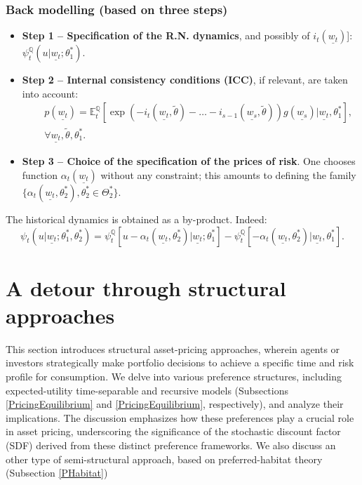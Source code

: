 \documentclass[
  12pt,
]{book}
\providecommand{\tightlist}{%
  \setlength{\itemsep}{0pt}\setlength{\parskip}{0pt}}
\theoremstyle{definition}
\theoremstyle{definition}
\theoremstyle{definition}
\theoremstyle{definition}
\theoremstyle{remark}
\begin{document}
\hypertarget{back-modelling-based-on-three-steps}{%
\subsection{Back modelling (based on three steps)}\label{back-modelling-based-on-three-steps}}

\begin{itemize}
\tightlist
\item
  \textbf{Step 1 -- Specification of the R.N. dynamics}, and possibly of \(i_{t}(\underline{w_t})\){]}: \(\psi^{\mathbb{Q}}_t (u | \underline{w_t}; \theta^*_1)\).
\item
  \textbf{Step 2 -- Internal consistency conditions (ICC)}, if relevant, are taken into account:
  \begin{equation*}
  \begin{array}{lll}
  && p(\underline{w_t}) = \mathbb{E}^{\mathbb{Q}}_t \left[ \exp (-i_{t} (\underline{w_t},\tilde{\theta}) - \dots - i_{s-1} (\underline{w_s}, \tilde{\theta}))g(\underline{w_s}) | \underline{w_t} , \theta^*_1\right] ,\\
  && \forall    \underline{w_t} , \tilde{\theta} , \theta^*_1.
  \end{array}
  \end{equation*}
\item
  \textbf{Step 3 -- Choice of the specification of the prices of risk}. One chooses function \(\alpha_t(\underline{w_t})\) without any constraint; this amounts to defining the family \(\{ \alpha_t (\underline{w_t}, \theta^*_2), \theta^*_2\in \Theta^*_2 \}\).
\end{itemize}

The historical dynamics is obtained as a by-product. Indeed:
\begin{equation*}
\psi_t(u | \underline{w_t} ; \theta^*_1, \theta^*_2) = \psi_t^{\mathbb{Q}}\left[ u -\alpha_t (\underline{w_t}, \theta^*_2)|\underline{w_t} ; \theta^*_1 \right] -\psi^{\mathbb{Q}}_t \left[- \alpha_t (\underline{w_t}, \theta^*_2) | \underline{w_t},\theta^*_1 \right].
\end{equation*}

\hypertarget{Structural}{%
\chapter{A detour through structural approaches}\label{Structural}}

This section introduces structural asset-pricing approaches, wherein agents or investors strategically make portfolio decisions to achieve a specific time and risk profile for consumption. We delve into various preference structures, including expected-utility time-separable and recursive models (Subsections \ref{PricingEquilibrium} and \ref{PricingEquilibrium}, respectively), and analyze their implications. The discussion emphasizes how these preferences play a crucial role in asset pricing, underscoring the significance of the stochastic discount factor (SDF) derived from these distinct preference frameworks. We also discuss an other type of semi-structural approach, based on preferred-habitat theory (Subsection \ref{PHabitat})
\end{document}

